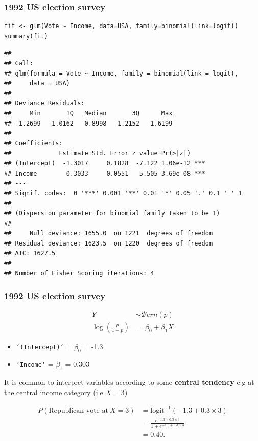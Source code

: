 \documentclass[pdf,handout]{beamer}
\begin{document}
\begin{frame}[fragile]
\frametitle{1992 US election survey}

\begin{lstlisting}[style=R]
fit <- glm(Vote ~ Income, data=USA, family=binomial(link=logit))
summary(fit)
\end{lstlisting}

\tiny
\begin{verbatim}
## 
## Call:
## glm(formula = Vote ~ Income, family = binomial(link = logit), 
##     data = USA)
## 
## Deviance Residuals: 
##     Min       1Q   Median       3Q      Max  
## -1.2699  -1.0162  -0.8998   1.2152   1.6199  
## 
## Coefficients:
##             Estimate Std. Error z value Pr(>|z|)    
## (Intercept)  -1.3017     0.1828  -7.122 1.06e-12 ***
## Income        0.3033     0.0551   5.505 3.69e-08 ***
## ---
## Signif. codes:  0 '***' 0.001 '**' 0.01 '*' 0.05 '.' 0.1 ' ' 1
## 
## (Dispersion parameter for binomial family taken to be 1)
## 
##     Null deviance: 1655.0  on 1221  degrees of freedom
## Residual deviance: 1623.5  on 1220  degrees of freedom
## AIC: 1627.5
## 
## Number of Fisher Scoring iterations: 4
\end{verbatim}
\normalsize

\end{frame}

\begin{frame}[fragile]
\frametitle{1992 US election survey}

$$
\begin{aligned}
Y  & \sim \mathcal{B}ern(p)\\
\log\left(\frac{p}{1 - p}\right) &  = \beta_0 + \beta_1 X
\end{aligned}
$$

\begin{itemize}
\item \texttt{`(Intercept)`} = $\beta_0$ = -1.3
\item \texttt{`Income`} = $\beta_1$ = 0.303
\end{itemize}

It is common to interpret variables according to some \textbf{central tendency} e.g at
the central income category (i.e $X=3$)

$$
\begin{aligned}
P(\mbox{Republican vote at}~X = 3) &= \mbox{logit}^{-1}\left(-1.3 + 0.3 \times 3\right)\\
&= \frac{e^{-1.3 + 0.3 \times 3}}{1 + e^{-1.3 + 0.3 \times 3}}\\
&= 0.40.
\end{aligned}
$$

\end{frame}
\end{document}
